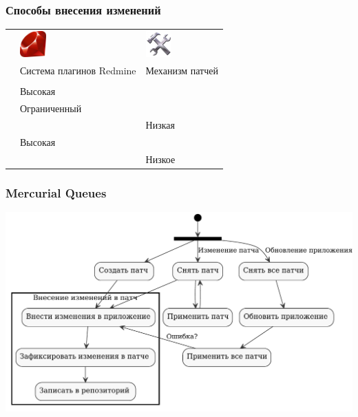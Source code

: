 \documentclass[unicode]{beamer}
\begin{document}
\begin{frame}
\transwipe[direction=90]
\frametitle{Способы внесения изменений}
\begin{tabular}{ >{\centering\arraybackslash}m{}  >{\centering\arraybackslash}m{}
>{\centering\arraybackslash}m{}}

&\includegraphics[width=1cm]{Ruby_logo.pdf}&\includegraphics[width=1cm]{patch-management.jpg}\\
& Система плагинов Redmine & Механизм патчей\\
&&\\
\hline
\color{blue}{Сложность разработки} & Высокая & \color{red}{Низкая} \\
\hline
\color{blue}{Спектр решаемых задач} & Ограниченный & \color{red}{Максимальный}\\
\hline
\color{blue}{Устойчивость к обновлениям системы} & \color{red}{Высокая} & Низкая \\
\hline
\color{blue}{Стоимость внесения изменений} & Высокая & \color{red}{Средняя} \\
\hline
\color{blue}{Удобство распространения} & \color{red}{Высокое} & Низкое \\
\hline
\end{tabular}
\end{frame}

\begin{frame}
\transwipe[direction=90]
\frametitle{Mercurial Queues}
\centerline{\includegraphics[width=1\textwidth]{mq-workflow.pdf}}
\end{frame}
\end{document}
